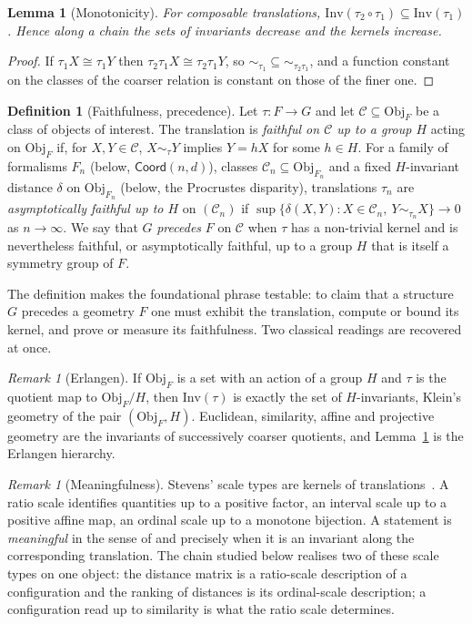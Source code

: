 \documentclass[11pt,a4paper]{article}
\theoremstyle{plain}
\newtheorem{lemma}[theorem]{Lemma}
\theoremstyle{definition}
\newtheorem{definition}[theorem]{Definition}
\theoremstyle{remark}
\newtheorem{remark}[theorem]{Remark}
\newcommand{\Obj}{\mathrm{Obj}}
\newcommand{\Inv}{\mathrm{Inv}}
\newcommand{\Fcoord}{\mathsf{Coord}}
\begin{document}
\begin{lemma}[Monotonicity]\label{lem:mono}
For composable translations, $\Inv(\tau_2\circ\tau_1)\subseteq\Inv(\tau_1)$. Hence along a chain the sets of invariants decrease and the kernels increase.
\end{lemma}
\begin{proof}
If $\tau_1X\cong\tau_1Y$ then $\tau_2\tau_1X\cong\tau_2\tau_1Y$, so $\sim_{\tau_1}\subseteq\sim_{\tau_2\tau_1}$, and a function constant on the classes of the coarser relation is constant on those of the finer one.
\end{proof}

\begin{definition}[Faithfulness, precedence]
Let $\tau\colon F\to G$ and let $\mathcal C\subseteq\Obj_F$ be a class of objects of interest. The translation is \emph{faithful on $\mathcal C$ up to a group $H$} acting on $\Obj_F$ if, for $X,Y\in\mathcal C$, $X\sim_\tau Y$ implies $Y=hX$ for some $h\in H$. For a family of formalisms $F_n$ (below, $\Fcoord(n,d)$), classes $\mathcal C_n\subseteq\Obj_{F_n}$ and a fixed $H$-invariant distance $\delta$ on $\Obj_{F_n}$ (below, the Procrustes disparity), translations $\tau_n$ are \emph{asymptotically faithful up to $H$} on $(\mathcal C_n)$ if $\sup\{\delta(X,Y): X\in\mathcal C_n,\ Y\sim_{\tau_n}X\}\to0$ as $n\to\infty$. We say that $G$ \emph{precedes} $F$ on $\mathcal C$ when $\tau$ has a non-trivial kernel and is nevertheless faithful, or asymptotically faithful, up to a group $H$ that is itself a symmetry group of $F$.
\end{definition}

The definition makes the foundational phrase testable: to claim that a structure $G$ precedes a geometry $F$ one must exhibit the translation, compute or bound its kernel, and prove or measure its faithfulness. Two classical readings are recovered at once.

\begin{remark}[Erlangen]
If $\Obj_F$ is a set with an action of a group $H$ and $\tau$ is the quotient map to $\Obj_F/H$, then $\Inv(\tau)$ is exactly the set of $H$-invariants, Klein's geometry of the pair $(\Obj_F,H)$. Euclidean, similarity, affine and projective geometry are the invariants of successively coarser quotients, and Lemma~\ref{lem:mono} is the Erlangen hierarchy.
\end{remark}

\begin{remark}[Meaningfulness]
Stevens' scale types are kernels of translations~\citep{stevens1946}. A ratio scale identifies quantities up to a positive factor, an interval scale up to a positive affine map, an ordinal scale up to a monotone bijection. A statement is \emph{meaningful} in the sense of \citet{krantz1971} and \citet{narens2002} precisely when it is an invariant along the corresponding translation. The chain studied below realises two of these scale types on one object: the distance matrix is a ratio-scale description of a configuration and the ranking of distances is its ordinal-scale description; a configuration read up to similarity is what the ratio scale determines.
\end{remark}
\end{document}
